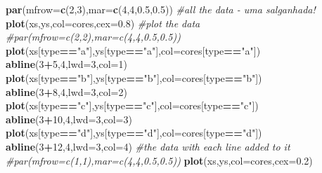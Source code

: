 \documentclass[
]{book}
\newenvironment{Shaded}{\begin{snugshade}}{\end{snugshade}}
\newcommand{\AttributeTok}[1]{\textcolor[rgb]{0.13,0.29,0.53}{#1}}
\newcommand{\CommentTok}[1]{\textcolor[rgb]{0.56,0.35,0.01}{\textit{#1}}}
\newcommand{\DecValTok}[1]{\textcolor[rgb]{0.00,0.00,0.81}{#1}}
\newcommand{\FloatTok}[1]{\textcolor[rgb]{0.00,0.00,0.81}{#1}}
\newcommand{\FunctionTok}[1]{\textcolor[rgb]{0.13,0.29,0.53}{\textbf{#1}}}
\newcommand{\NormalTok}[1]{#1}
\newcommand{\SpecialCharTok}[1]{\textcolor[rgb]{0.81,0.36,0.00}{\textbf{#1}}}
\newcommand{\StringTok}[1]{\textcolor[rgb]{0.31,0.60,0.02}{#1}}
\begin{document}
\begin{Shaded}
\begin{Highlighting}[]
\FunctionTok{par}\NormalTok{(}\AttributeTok{mfrow=}\FunctionTok{c}\NormalTok{(}\DecValTok{2}\NormalTok{,}\DecValTok{3}\NormalTok{),}\AttributeTok{mar=}\FunctionTok{c}\NormalTok{(}\DecValTok{4}\NormalTok{,}\DecValTok{4}\NormalTok{,}\FloatTok{0.5}\NormalTok{,}\FloatTok{0.5}\NormalTok{))}
\CommentTok{\#all the data {-} uma salganhada!}
\FunctionTok{plot}\NormalTok{(xs,ys,}\AttributeTok{col=}\NormalTok{cores,}\AttributeTok{cex=}\FloatTok{0.8}\NormalTok{)}
\CommentTok{\#plot the data}
\CommentTok{\#par(mfrow=c(2,2),mar=c(4,4,0.5,0.5))}
\FunctionTok{plot}\NormalTok{(xs[type}\SpecialCharTok{==}\StringTok{"a"}\NormalTok{],ys[type}\SpecialCharTok{==}\StringTok{"a"}\NormalTok{],}\AttributeTok{col=}\NormalTok{cores[type}\SpecialCharTok{==}\StringTok{"a"}\NormalTok{])}
\FunctionTok{abline}\NormalTok{(}\DecValTok{3}\SpecialCharTok{+}\DecValTok{5}\NormalTok{,}\DecValTok{4}\NormalTok{,}\AttributeTok{lwd=}\DecValTok{3}\NormalTok{,}\AttributeTok{col=}\DecValTok{1}\NormalTok{)}
\FunctionTok{plot}\NormalTok{(xs[type}\SpecialCharTok{==}\StringTok{"b"}\NormalTok{],ys[type}\SpecialCharTok{==}\StringTok{"b"}\NormalTok{],}\AttributeTok{col=}\NormalTok{cores[type}\SpecialCharTok{==}\StringTok{"b"}\NormalTok{])}
\FunctionTok{abline}\NormalTok{(}\DecValTok{3}\SpecialCharTok{+}\DecValTok{8}\NormalTok{,}\DecValTok{4}\NormalTok{,}\AttributeTok{lwd=}\DecValTok{3}\NormalTok{,}\AttributeTok{col=}\DecValTok{2}\NormalTok{)}
\FunctionTok{plot}\NormalTok{(xs[type}\SpecialCharTok{==}\StringTok{"c"}\NormalTok{],ys[type}\SpecialCharTok{==}\StringTok{"c"}\NormalTok{],}\AttributeTok{col=}\NormalTok{cores[type}\SpecialCharTok{==}\StringTok{"c"}\NormalTok{])}
\FunctionTok{abline}\NormalTok{(}\DecValTok{3}\SpecialCharTok{+}\DecValTok{10}\NormalTok{,}\DecValTok{4}\NormalTok{,}\AttributeTok{lwd=}\DecValTok{3}\NormalTok{,}\AttributeTok{col=}\DecValTok{3}\NormalTok{)}
\FunctionTok{plot}\NormalTok{(xs[type}\SpecialCharTok{==}\StringTok{"d"}\NormalTok{],ys[type}\SpecialCharTok{==}\StringTok{"d"}\NormalTok{],}\AttributeTok{col=}\NormalTok{cores[type}\SpecialCharTok{==}\StringTok{"d"}\NormalTok{])}
\FunctionTok{abline}\NormalTok{(}\DecValTok{3}\SpecialCharTok{+}\DecValTok{12}\NormalTok{,}\DecValTok{4}\NormalTok{,}\AttributeTok{lwd=}\DecValTok{3}\NormalTok{,}\AttributeTok{col=}\DecValTok{4}\NormalTok{)}
\CommentTok{\#the data with each line added to it}
\CommentTok{\#par(mfrow=c(1,1),mar=c(4,4,0.5,0.5))}
\FunctionTok{plot}\NormalTok{(xs,ys,}\AttributeTok{col=}\NormalTok{cores,}\AttributeTok{cex=}\FloatTok{0.2}\NormalTok{)}

\end{Highlighting}
\end{Shaded}
\end{document}
